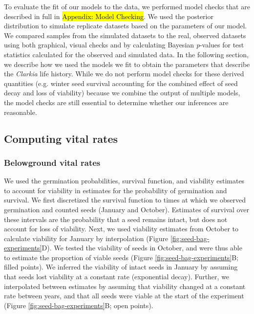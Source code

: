 \documentclass[12pt, oneside, titlepage]{article}   	%
\begin{document}
{To evaluate the fit of our models to the data, we performed model checks that are described in full in \hl{Appendix: Model Checking}. We used the posterior distribution to simulate replicate datasets based on the parameters of our model. We compared samples from the simulated datasets to the real, observed datasets using both graphical, visual checks and by calculating Bayesian \textit{p}-values for test statistics calculated for the observed and simulated data. In the following section, we describe how we used the models we fit to obtain the parameters that describe the \textit{Clarkia} life history. While we do not perform model checks for these derived quantities (e.g. winter seed survival accounting for the combined effect of seed decay and loss of viability) because we combine the output of multiple models, the model checks are still essential to determine whether our inferences are reasonable.

\subsection{Computing vital rates}

\subsubsection{Belowground vital rates}

We used the germination probabilities, survival function, and viability estimates to account for viability in estimates for the probability of germination and survival. We first discretized the survival function to times at which we observed germination and counted seeds (January and October). Estimates of survival over these intervals are the probability that a seed remains intact, but does not account for loss of viability. Next, we used viability estimates from October to calculate viability for January by interpolation (Figure \ref{fig:seed-bag-experiments}D). We tested the viability of seeds in October, and were thus able to estimate the proportion of viable seeds (Figure \ref{fig:seed-bag-experiments}B; filled points). We inferred the viability of intact seeds in January by assuming that seeds lost viability at a constant rate (exponential decay). Further, we interpolated between estimates by assuming that viability changed at a constant rate between years, and that all seeds were viable at the start of the experiment (Figure \ref{fig:seed-bag-experiments}B; open points). 

}
\end{document}
